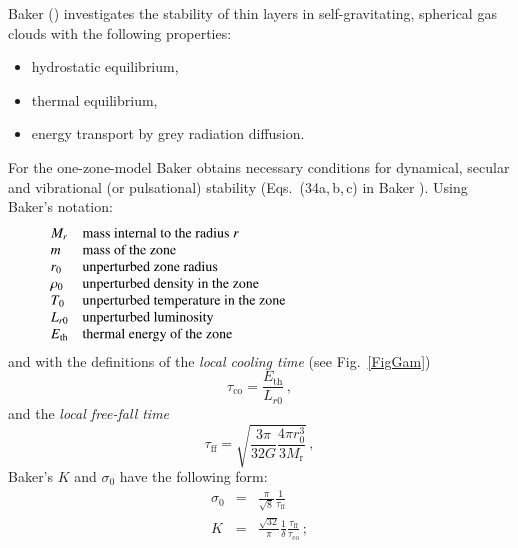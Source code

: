 \documentclass{layout}
\begin{document}
%


%


   Baker (\cite{baker}) investigates the stability of thin layers in
   self-gravitating,
   spherical gas clouds with the following properties:
   \begin{itemize}
      \item hydrostatic equilibrium,
      \item thermal equilibrium,
      \item energy transport by grey radiation diffusion.
   \end{itemize}
   For the one-zone-model Baker obtains necessary conditions
   for dynamical, secular and vibrational (or pulsational)
   stability (Eqs.\ (34a,\,b,\,c) in Baker \cite{baker}). Using Baker's
   notation:
   \[
      \begin{array}{lp{0.8\linewidth}}
         M_{r}  & mass internal to the radius $r$     \\
         m               & mass of the zone                    \\
         r_0             & unperturbed zone radius             \\
         \rho_0          & unperturbed density in the zone     \\
         T_0             & unperturbed temperature in the zone \\
         L_{r0}          & unperturbed luminosity              \\
         E_{\mathrm{th}} & thermal energy of the zone
      \end{array}
   \]
\noindent
   and with the definitions of the \emph{local cooling time\/}
   (see Fig.~\ref{FigGam})
   \begin{equation}
      \tau_{\mathrm{co}} = \frac{E_{\mathrm{th}}}{L_{r0}} \,,
   \end{equation}
   and the \emph{local free-fall time}
   \begin{equation}
      \tau_{\mathrm{ff}} =
         \sqrt{ \frac{3 \pi}{32 G} \frac{4\pi r_0^3}{3 M_{\mathrm{r}}}
}\,,
   \end{equation}
   Baker's $K$ and $\sigma_0$ have the following form:
   \begin{eqnarray}
      \sigma_0 & = & \frac{\pi}{\sqrt{8}}
                     \frac{1}{ \tau_{\mathrm{ff}}} \\
      K        & = & \frac{\sqrt{32}}{\pi} \frac{1}{\delta}
                        \frac{ \tau_{\mathrm{ff}} }
                             { \tau_{\mathrm{co}} }\,;
   \end{eqnarray}
\end{document}
